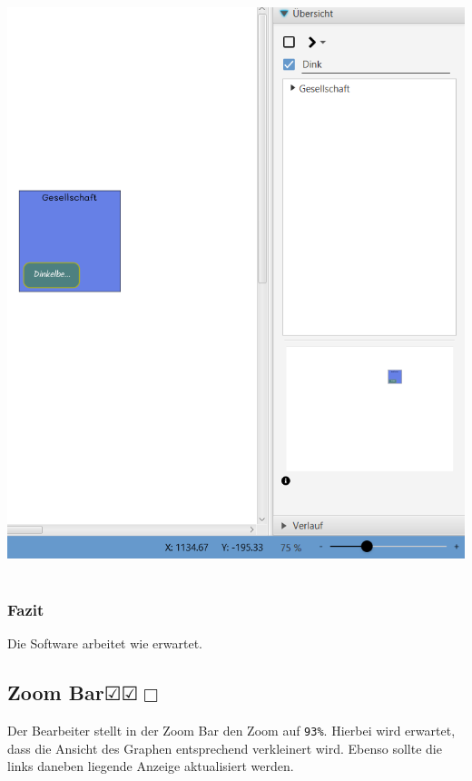 \documentclass[enabledeprecatedfontcommands]{scrartcl}
\newcommand{\subsectiont}[2]{\subsection[#1]{#1{\normalsize\normalfont #2}}}
\newcommand{\leer}{$\Box$}
\newcommand{\ok}{$\CheckedBox$}
\begin{document}
\begin{center}
\includegraphics[height=17cm]{zoom75nachher.PNG}
\end{center}
\subsubsection{Fazit}
Die Software arbeitet wie erwartet.

\subsectiont{Zoom Bar}{\dotfill\ok\ok\leer}
Der Bearbeiter stellt in der Zoom Bar den Zoom auf \texttt{93\%}. Hierbei wird erwartet, dass die Ansicht des Graphen entsprechend verkleinert wird. Ebenso sollte die links daneben liegende Anzeige aktualisiert werden. 
\end{document}
